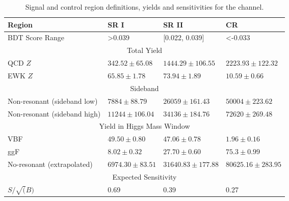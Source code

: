\begin{table}[htbp]
\centering
\caption{Signal and control region definitions, yields and sensitivities for the \fourcentral channel. }
\label{tab:BDTReg4cen_CR}
\begin{tabular}{|l|l|l|l|}
\hline
Region              & SR I       & SR II     & CR    \\ \hline
\hline
BDT Score Range &  >0.039 & [0.022, 0.039]   & <-0.033 \\ \hline

\multicolumn{4}{|c|}{Total Yield}                                                        \\ \hline
QCD $Z$  & $342.52 \pm 65.08$   &  $1444.29 \pm 106.55$  & $2223.93 \pm 122.32$     \\ \cline{2-4} 
EWK $Z$  & $65.85 \pm 1.78$   &  $73.94 \pm 1.89$ &    $10.59 \pm 0.66$  \\ \hline

\multicolumn{4}{|c|}{Sideband}  \\ \hline
Non-resonant (sideband low)   & $ 7884 \pm 88.79$  & $26059 \pm 161.43 $ & $50004 \pm 223.62  $    \\ \cline{2-4} 
Non-resonant (sideband high)  & $ 11244 \pm 106.04$  & $34136 \pm 184.76 $ & $72620 \pm 269.48 $   \\ \hline

\multicolumn{4}{|c|}{Yield in Higgs Mass Window} \\
\hline
VBF                     & $49.50\pm 0.80$                  & $ 47.06\pm 0.78$                 & $1.96 \pm 0.16$                    \\ \hline
ggF                     & $8.02 \pm 0.32$                  & $27.70 \pm 0.60$                 & $75.3 \pm 0.99$                    \\ \hline
No-resonant (extrapolated) & $6974.30 \pm 83.51$                & $31640.83 \pm 177.88$               &  $80625.16 \pm 283.95$                  \\ \hline
\hline 
\multicolumn{4}{|c|}{Expected Sensitivity} \\
\hline
$S/ \sqrt(B)$           & 0.69                  & 0.39                  & 0.27                    \\ \hline
\end{tabular}
\end{table}
